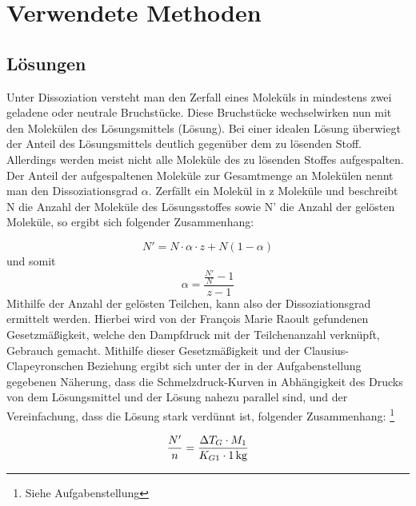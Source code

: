 \section{Verwendete Methoden}
\subsection{Lösungen}
Unter Dissoziation versteht man den Zerfall eines Moleküls in mindestens zwei geladene oder neutrale Bruchstücke. Diese Bruchstücke wechselwirken nun mit den Molekülen des Lösungsmittels (Lösung). Bei einer idealen Lösung überwiegt der Anteil des Lösungsmittels deutlich gegenüber dem zu lösenden Stoff. Allerdings werden meist nicht alle Moleküle des zu lösenden Stoffes aufgespalten. Der Anteil der aufgespaltenen Moleküle zur Gesamtmenge an Molekülen nennt man den Dissoziationsgrad $\alpha$. Zerfällt ein Molekül in z Moleküle und beschreibt N die Anzahl der Moleküle des Lösungsstoffes sowie N' die Anzahl der gelösten Moleküle, so ergibt sich folgender Zusammenhang:

\begin{equation}
N' = N \cdot \alpha \cdot z + N(1-\alpha) \label{eq:N'}
\end{equation}
und somit
\begin{equation}
\alpha = \frac{\frac{N'}{N}-1}{z-1} \label{eq:alpha}
\end{equation}
%
Mithilfe der Anzahl der gelösten Teilchen, kann also der Dissoziationsgrad ermittelt werden. Hierbei wird von der  François Marie Raoult gefundenen Gesetzmäßigkeit, welche den Dampfdruck mit der Teilchenanzahl verknüpft, Gebrauch gemacht. Mithilfe dieser Gesetzmäßigkeit und der Clausius-Clapeyronschen Beziehung ergibt sich unter der in der Aufgabenstellung gegebenen Näherung, dass die Schmelzdruck-Kurven in Abhängigkeit des Drucks von dem Lösungsmittel und der Lösung nahezu parallel sind, und der Vereinfachung, dass die Lösung stark verdünnt ist, folgender Zusammenhang: \footnote{Siehe Aufgabenstellung}

\begin{equation}
\frac{N'}{n} = \frac{\Delta T_G \cdot M_1}{K_{G1} \cdot \unit[1]{kg}}
\end{equation}

